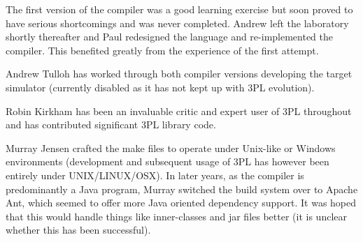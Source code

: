         The first version of the compiler was a good learning exercise but soon
        proved to have serious shortcomings and was never completed. Andrew left
        the laboratory shortly thereafter and Paul redesigned the language and
        re-implemented the compiler. This benefited greatly from the experience
        of the first attempt.

        Andrew Tulloh has worked through both compiler versions developing the
        target simulator (currently disabled as it has not kept up with 3PL
        evolution).

        Robin Kirkham has been an invaluable critic and expert user of 3PL
        throughout and has contributed significant 3PL library code.

        Murray Jensen crafted the make files to operate under Unix-like
        or Windows environments (development and subsequent usage of 3PL
        has however been entirely under UNIX/LINUX/OSX). In later years,
        as the compiler is predominantly a Java program, Murray switched
        the build system over to Apache Ant, which seemed to offer more
        Java oriented dependency support. It was hoped that this would
        handle things like inner-classes and jar files better (it is
        unclear whether this has been successful).
